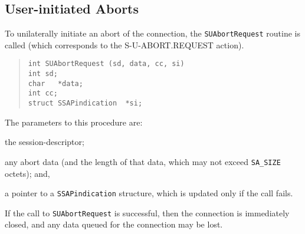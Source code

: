 \subsection	{User-initiated Aborts}
To unilaterally initiate an abort of the connection,
the \verb"SUAbortRequest" routine is called
(which corresponds to the {\sf S-U-ABORT.REQUEST\/} action).
\begin{quote}\small\begin{verbatim}
int	SUAbortRequest (sd, data, cc, si)
int	sd;
char   *data;
int	cc;
struct SSAPindication  *si;
\end{verbatim}\end{quote}
The parameters to this procedure are:
\begin{describe}
\item[\verb"sd":] the session-descriptor;

\item[\verb"data"/\verb"cc":] any abort data
(and the length of that data, which may not exceed \verb"SA_SIZE" octets);
and,

\item[\verb"si":] a pointer to a \verb"SSAPindication" structure, which is
updated only if the call fails.
\end{describe}
If the call to \verb"SUAbortRequest" is successful,
then the connection is immediately closed,
and any data queued for the connection may be lost.

